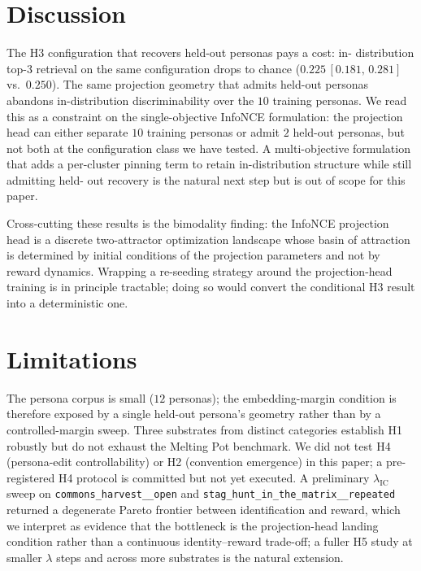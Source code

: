 \documentclass[11pt]{article}
\newcommand{\InfoNCE}{InfoNCE\xspace}
\newcommand{\cH}{\texttt{commons\_harvest\_\_open}\xspace}
\newcommand{\stag}{\texttt{stag\_hunt\_in\_the\_matrix\_\_repeated}\xspace}
\begin{document}
\section{Discussion}
\label{sec:discussion}

The H3 configuration that recovers held-out personas pays a cost: in-
distribution top-3 retrieval on the same configuration drops to chance
($0.225\,[0.181,\,0.281]$ vs.\ $0.250$). The same projection geometry that
admits held-out personas abandons in-distribution discriminability over the
$10$ training personas. We read this as a constraint on the single-objective
\InfoNCE formulation: the projection head can either separate $10$ training
personas or admit $2$ held-out personas, but not both at the configuration
class we have tested. A multi-objective formulation that adds a per-cluster
pinning term to retain in-distribution structure while still admitting held-
out recovery is the natural next step but is out of scope for this paper.

Cross-cutting these results is the bimodality finding: the \InfoNCE
projection head is a discrete two-attractor optimization landscape whose
basin of attraction is determined by initial conditions of the projection
parameters and not by reward dynamics. Wrapping a re-seeding strategy around
the projection-head training is in principle tractable; doing so would convert
the conditional H3 result into a deterministic one.

\section{Limitations}
\label{sec:limits}

The persona corpus is small ($12$ personas); the embedding-margin condition
is therefore exposed by a single held-out persona's geometry rather than by a
controlled-margin sweep. Three substrates from distinct categories establish
H1 robustly but do not exhaust the Melting Pot benchmark. We did not test
H4 (persona-edit controllability) or H2 (convention emergence) in this
paper; a pre-registered H4 protocol is committed but not yet executed. A
preliminary $\lambda_{\text{IC}}$ sweep on \cH and \stag returned a
degenerate Pareto frontier between identification and reward, which we
interpret as evidence that the bottleneck is the projection-head landing
condition rather than a continuous identity--reward trade-off; a fuller H5
study at smaller $\lambda$ steps and across more substrates is the natural
extension.
\end{document}

